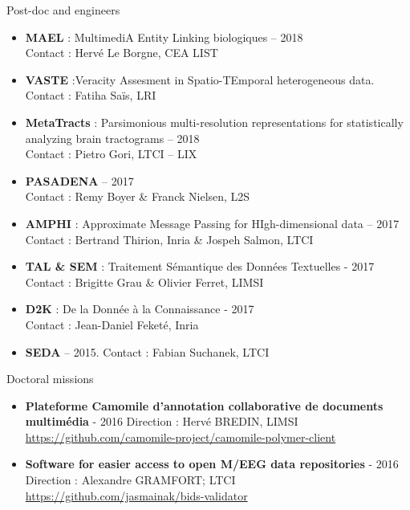 \begin{frame}{Post-doc and engineers}

\small
\begin{itemize}
\item 
\textbf{MAEL} : MultimediA Entity Linking biologiques – 2018
\\
Contact : Hervé Le Borgne, CEA LIST
\item
\textbf{VASTE} :Veracity Assesment in Spatio-TEmporal heterogeneous data. 
\\
Contact : Fatiha Saïs, LRI
\item
\textbf{MetaTracts} : Parsimonious multi-resolution representations for 
statistically analyzing brain tractograms – 2018
\\
Contact : Pietro Gori, LTCI – LIX
\item
\textbf{PASADENA} 
– 2017
\\
Contact : Remy Boyer \& Franck Nielsen, L2S
\item
\textbf{AMPHI} : Approximate Message Passing for HIgh-dimensional data – 2017
\\
Contact : Bertrand Thirion, Inria \& Jospeh Salmon, LTCI
\item
\textbf{TAL \& SEM} : Traitement Sémantique des Données Textuelles - 2017
\\
Contact : Brigitte Grau \& Olivier Ferret, LIMSI
\item
\textbf{D2K} : De la Donnée à la Connaissance - 2017
\\
Contact : Jean-Daniel Feketé, Inria
\item
\textbf{SEDA} – 2015. Contact : Fabian Suchanek, LTCI
\end{itemize}
\end{frame}

\begin{frame}{Doctoral missions}

\begin{itemize}
\item
\textbf{
Plateforme Camomile d’annotation collaborative de documents multimédia} - 2016
Direction : Hervé BREDIN, LIMSI
\url{https://github.com/camomile-project/camomile-polymer-client}
\item
\textbf{Software for easier access to open M/EEG data repositories} - 2016
Direction : Alexandre GRAMFORT; LTCI
\url{https://github.com/jasmainak/bids-validator}
\end{itemize}
\end{frame}

